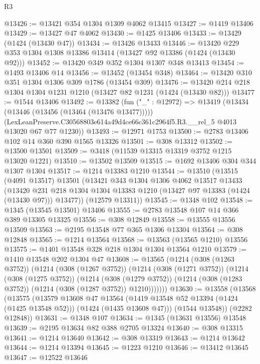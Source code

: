 \begin{lexlean}{R3}
\begin{coremodule}
@13426 := @13421 @354 @1304 @1309 @4062 @13415
@13427 := @1419 @13406
@13429 := @13427 @47 @4062
@13430 := @1425 @13406
@13433 := @13429 (@1424 (@13430 @47))
@13434 := @13426 @13433
@13446 := @13420 @229 @353 @1304 @1308 @13386 @13414 (@13427 @92 @13386 (@1424 (@13430 @92)))
@13452 := @13420 @349 @352 @1304 @1307 @348 @13413
@13454 := @1493 @13406 @14
@13456 := @13452 (@13454 @348)
@13464 := @13420 @310 @351 @1304 @1306 @309 @1786 (@13454 @309)
@13476 := @13420 @214 @218 @1304 @1304 @1231 @1210 (@13427 @82 @1231 (@1424 (@13430 @82)))
@13477 := @1544 @13406
@13492 := @13382
    (fun ("_" : @12972) =>
    @13419
      (@13434 (@13446 (@13456 (@13464 (@13476 @13477)))))
      (LexLeanPreserve.C30568803e614a49d4ce66c361c2964f5.R3.__rel_5 @4013 @13020 @67 @77 @1230))
@13493 := @12971 @1753
@13500 := @2783 @13406 @102 @14 @360 @390 @1565 @13326
@13501 := @308 @13312
@13502 := @13500 @13501
@13509 := @3418 (@11539 @13315 @13319 @3752 @1215 @13020 @1221)
@13510 := @13502 @13509
@13515 := @1692 @13406 @304 @344 @1307 @1304
@13517 := @1214 @13383 @1210
@13544 := @13510
    (@13515
      (@4091 @13517)
      @13501
      (@13421
        @343
        @1304
        @1306
        @4062
        @13517
        @13433
        (@13420 @231 @218 @1304 @1304 @13383 @1210 (@13427 @97 @13383 (@1424 (@13430 @97))) @13477))
      (@12579 @13311))
@13545 := @1348 @102
@13548 := @1345 (@13545 @13501) @13406
@13555 := @2783 @13548 @107 @14 @366 @389 @13305 @13325
@13556 := @308 @12849
@13558 := @13555 @13556 @13509
@13563 := @2195 @13548 @77 @365 @1306 @13304
@13564 := @308 @12848
@13565 := @1214 @13564
@13568 := @13563 (@13565 @1210) @13556
@13575 := @1401 @13548 @328 @218 @1304 @1304 @13564 @1210
@13579 := @1410 @13548 @202 @1304 @47
@13608 := @13565
    (@1214
      (@308 (@1263 @3752))
      (@1214
        (@308 (@1267 @3752))
        (@1214
          (@308 (@1271 @3752))
          (@1214
            (@308 (@1275 @3752))
            (@1214
              (@308 (@1279 @3752))
              (@1214 (@308 (@1283 @3752)) (@1214 (@308 (@1287 @3752)) @1210)))))))
@13630 := @13558
    (@13568
      (@13575
        (@13579
          @13608
          @47
          @13564
          (@1419 @13548 @52 @13394 (@1424 (@1425 @13548 @52)))
          (@1424 (@1435 @13608 @47)))
        (@1544 @13548))
      (@2282 @12848))
@13631 := @1348 @107
@13634 := @1345 (@13631 @13556) @13548
@13639 := @2195 @13634 @82 @388 @2705 @13324
@13640 := @308 @13315
@13641 := @1214 @13640
@13642 := @308 @13319
@13643 := @1214 @13642
@13644 := @1214 @13394
@13645 := @1223 @1210
@13646 := @13412 @13645
@13647 := @12522 @13646

\end{coremodule}
\end{lexlean}
